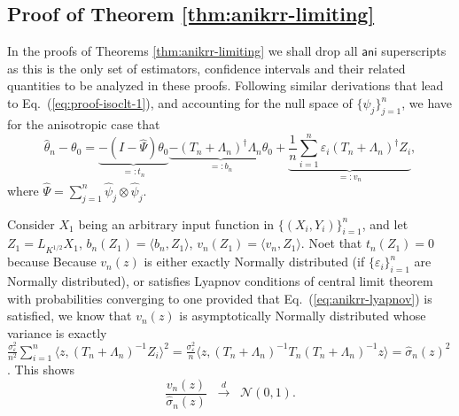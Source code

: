 \documentclass[11pt,a4paper]{article}
\renewcommand{\hat}{\widehat}
\theoremstyle{definition}
\theoremstyle{plain}
\theoremstyle{remark}
\newcommand{\ani}{\mathsf{ani}}
\begin{document}
\subsection{Proof of Theorem \ref{thm:anikrr-limiting}}

In the proofs of Theorems \ref{thm:anikrr-limiting} we shall drop all $\ani$ superscripts as this is the only set of estimators, confidence intervals and their related quantities to be analyzed in these proofs.
Following similar derivations that lead to Eq.~(\ref{eq:proof-isoclt-1}), and accounting for the null space of $\{\hat\psi_j\}_{j=1}^n$, we have for the anisotropic case that
\begin{equation}
\hat\theta_n-\theta_0 =\underbrace{-(I-\hat\Psi)\theta_0}_{=:t_n}\underbrace{- (T_n+\Lambda_n)^{\dagger}\Lambda_n\theta_0}_{=: b_n} + \underbrace{\frac{1}{n}\sum_{i=1}^n\varepsilon_i(T_n+\Lambda_n)^{\dagger}Z_i}_{=:v_n},
\label{eq:proof-aniclt-1}
\end{equation}
where $\hat\Psi = \sum_{j=1}^n\hat\psi_j\otimes\hat\psi_j$.

Consider $X_1$ being an arbitrary input function in $\{(X_i,Y_i)\}_{i=1}^n$,
and let $Z_1=L_{K^{1/2}}X_1$, $b_n(Z_1)=\langle b_n,Z_1\rangle$, $v_n(Z_1)=\langle v_n,Z_1\rangle$.
Noet that $t_n(Z_1)=0$ because 
Because $v_n(z)$ is either exactly Normally distributed (if $\{\varepsilon_i\}_{i=1}^n$ are Normally distributed), or satisfies Lyapnov conditions of central limit theorem with probabilities converging to one
provided that Eq.~(\ref{eq:anikrr-lyapnov}) is satisfied, we know that $v_n(z)$ is asymptotically Normally distributed whose variance is exactly $\frac{\sigma_\varepsilon^2}{n^2}\sum_{i=1}^n\langle z, (T_n+\Lambda_n)^{-1}Z_i\rangle^2 = \frac{\sigma_\varepsilon^2}{n}\langle z, (T_n+\Lambda_n)^{-1}T_n(T_n+\Lambda_n)^{-1}z\rangle=\hat\sigma_n(z)^2$. This shows
\begin{equation}
\frac{v_n(z)}{\hat\sigma_n(z)}\;\;\overset{d}{\to}\;\;\mathcal N(0,1).
\label{eq:proof-aniclt-2}
\end{equation}
\end{document}
